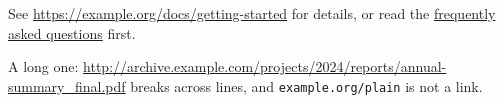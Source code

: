 \documentclass{article}
\begin{document}
See \url{https://example.org/docs/getting-started} for details, or read the
\href{https://example.org/faq}{frequently asked questions} first.

A long one: \url{http://archive.example.com/projects/2024/reports/annual-summary_final.pdf} breaks
across lines, and \nolinkurl{example.org/plain} is not a link.
\end{document}
